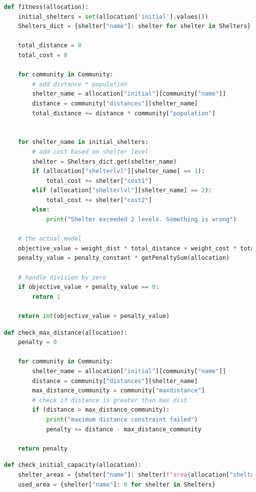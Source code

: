 \begin{appendices}
\begin{centerappendixtitle}
\pagebreak
\begin{lstlisting}[language=Python,caption={Objective Value}, label={objValCode}]
def fitness(allocation):
    initial_shelters = set(allocation['initial'].values())
    Shelters_dict = {shelter["name"]: shelter for shelter in Shelters}

    total_distance = 0
    total_cost = 0

    for community in Community:
        # add distance * population
        shelter_name = allocation["initial"][community["name"]]
        distance = community["distances"][shelter_name]
        total_distance += distance * community["population"]


    for shelter_name in initial_shelters:
        # add cost based on shelter level
        shelter = Shelters_dict.get(shelter_name)
        if (allocation["shelterlvl"][shelter_name] == 1):
            total_cost += shelter["cost1"] 
        elif (allocation["shelterlvl"][shelter_name] == 2):
            total_cost += shelter["cost2"] 
        else:
            print("Shelter exceeded 2 levels. Something is wrong")
        
    # the actual model
    objective_value = weight_dist * total_distance + weight_cost * total_cost
    penalty_value = penalty_constant * getPenaltySum(allocation)

    # handle division by zero
    if objective_value + penalty_value == 0:
        return 1

    return int(objective_value + penalty_value)
\end{lstlisting}

\begin{lstlisting}[language=Python,caption={Maximum Distance Constraint}, label={maxdistCode}]
def check_max_distance(allocation):
    penalty = 0

    for community in Community:
        shelter_name = allocation["initial"][community["name"]]
        distance = community["distances"][shelter_name]
        max_distance_community = community["maxdistance"]
        # check if distance is greater than max dist
        if (distance > max_distance_community):
            print("maximum distance constraint failed")
            penalty += distance - max_distance_community
        
    return penalty
\end{lstlisting}

\pagebreak
\begin{lstlisting}[language=Python,caption={Capacity Constraint}, label={capCode}]
def check_initial_capacity(allocation):
    shelter_areas = {shelter["name"]: shelter[f"area{allocation["shelterlvl"][shelter['name']]}"] for shelter in Shelters}
    used_area = {shelter["name"]: 0 for shelter in Shelters}


\end{lstlisting}
\end{centerappendixtitle}
\end{appendices}
